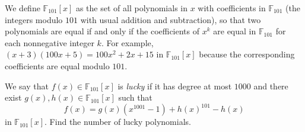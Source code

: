We define $\mathbb F_{101}[x]$ as the set of all polynomials in $x$ with coefficients in $\mathbb F_{101}$ (the integers modulo $101$ with usual addition and subtraction), so that two polynomials are equal if and only if the coefficients of $x^k$ are equal in $\mathbb F_{101}$ for each nonnegative integer $k$. For example, $(x+3)(100x+5)=100x^2+2x+15$ in $\mathbb F_{101}[x]$ because the corresponding coefficients are equal modulo $101$.

We say that $f(x)\in\mathbb F_{101}[x]$ is \emph{lucky} if it has degree at most $1000$ and there exist $g(x),h(x)\in\mathbb F_{101}[x]$ such that \[f(x)=g(x)(x^{1001}-1)+h(x)^{101}-h(x)\]in $\mathbb F_{101}[x]$. Find the number of lucky polynomials.

